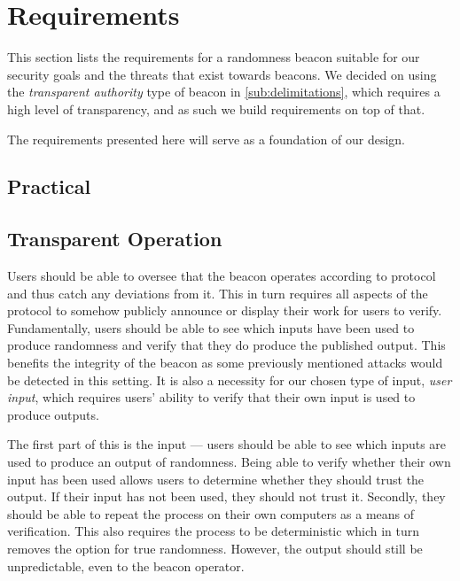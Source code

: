 \section{Requirements}%
\label{sec:beacon_requirements}
This section lists the requirements for a randomness beacon suitable for our security goals and the threats that exist towards beacons.
We decided on using the \emph{transparent authority} type of beacon in \cref{sub:delimitations}, which requires a high level of transparency, and as such we build requirements on top of that.

The requirements presented here will serve as a foundation of our design.

\subsection{Practical}

\subsection{Transparent Operation}
Users should be able to oversee that the beacon operates according to protocol and thus catch any deviations from it.
This in turn requires all aspects of the protocol to somehow publicly announce or display their work for users to verify.
Fundamentally, users should be able to see which inputs have been used to produce randomness and verify that they do produce the published output.
This benefits the integrity of the beacon as some previously mentioned attacks would be detected in this setting.
It is also a necessity for our chosen type of input, \emph{user input}, which requires users' ability to verify that their own input is used to produce outputs.

The first part of this is the input --- users should be able to see which inputs are used to produce an output of randomness.
Being able to verify whether their own input has been used allows users to determine whether they should trust the output.
If their input has not been used, they should not trust it.
Secondly, they should be able to repeat the process on their own computers as a means of verification.
This also requires the process to be deterministic which in turn removes the option for true randomness.
However, the output should still be unpredictable, even to the beacon operator.

